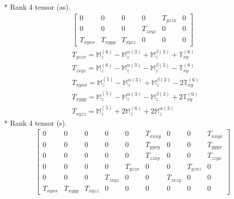 \documentclass[fleqn,8pt,landscape]{jsarticle}
\begin{document}
* Rank 4 tensor (as).
\begin{align*}
\begin{bmatrix} 0 & 0 & 0 & 0 & T_{yzzx} & 0 \\ 0 & 0 & 0 & T_{zxyz} & 0 & 0 \\ T_{xyxx} & T_{xyyy} & T_{xyzz} & 0 & 0 & 0 \end{bmatrix}
\end{align*}
\begin{align*}
& T_{yzzx} = \mathbb{M}_{z}^{(6)} - \mathbb{M}_{z}^{\alpha(3)} + \mathbb{M}_{z}^{\beta(3)} + \mathbb{T}_{xy}^{(6)} \\
& T_{zxyz} = \mathbb{M}_{z}^{(6)} - \mathbb{M}_{z}^{\alpha(3)} - \mathbb{M}_{z}^{\beta(3)} - \mathbb{T}_{xy}^{(6)} \\
& T_{xyxx} = \mathbb{M}_{z}^{(5)} - \mathbb{M}_{z}^{\alpha(3)} + \mathbb{M}_{z}^{\beta(3)} - 2 \mathbb{T}_{xy}^{(6)} \\
& T_{xyyy} = \mathbb{M}_{z}^{(5)} - \mathbb{M}_{z}^{\alpha(3)} - \mathbb{M}_{z}^{\beta(3)} + 2 \mathbb{T}_{xy}^{(6)} \\
& T_{xyzz} = \mathbb{M}_{z}^{(5)} + 2 \mathbb{M}_{z}^{(6)} + 2 \mathbb{M}_{z}^{\alpha(3)}
\end{align*}
* Rank 4 tensor (s).
\begin{align*}
\begin{bmatrix} 0 & 0 & 0 & 0 & 0 & T_{xxxy} & 0 & 0 & T_{xxyx} \\ 0 & 0 & 0 & 0 & 0 & T_{yyxy} & 0 & 0 & T_{yyyx} \\ 0 & 0 & 0 & 0 & 0 & T_{zzxy} & 0 & 0 & T_{zzyx} \\ 0 & 0 & 0 & 0 & T_{yzzx} & 0 & 0 & T_{yzxz} & 0 \\ 0 & 0 & 0 & T_{zxyz} & 0 & 0 & T_{zxzy} & 0 & 0 \\ T_{xyxx} & T_{xyyy} & T_{xyzz} & 0 & 0 & 0 & 0 & 0 & 0 \end{bmatrix}
\end{align*}
\end{document}
